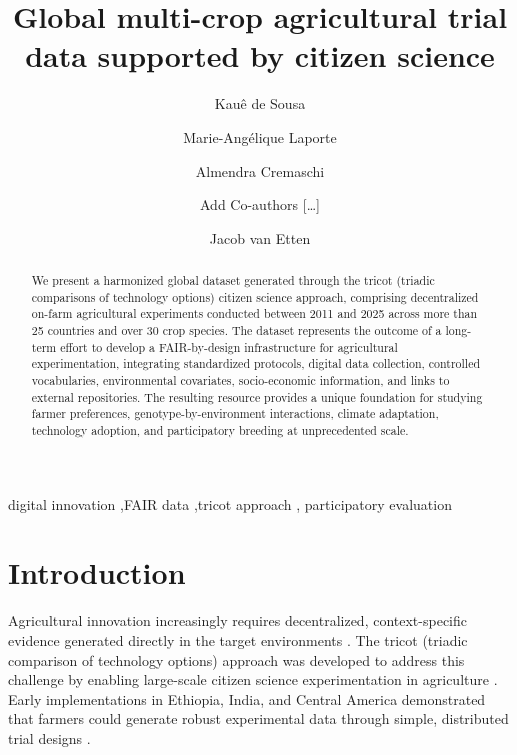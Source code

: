 \documentclass[3p]{elsarticle} %
\begin{document}
\begin{frontmatter}

  \title{Global multi-crop agricultural trial data supported by citizen
science}
    \author[a,b]{Kauê de Sousa%
  }
    \author[a]{Marie-Angélique Laporte%
  }
  
    \author[a]{Almendra Cremaschi%
  }
  
    \author[c]{Add Co-authors {[}\ldots{]}%
  }
  
    \author[a]{Jacob van Etten%
  }
  
  
  \begin{abstract}
  We present a harmonized global dataset generated through the tricot
  (triadic comparisons of technology options) citizen science approach,
  comprising decentralized on-farm agricultural experiments conducted
  between 2011 and 2025 across more than 25 countries and over 30 crop
  species. The dataset represents the outcome of a long-term effort to
  develop a FAIR-by-design infrastructure for agricultural
  experimentation, integrating standardized protocols, digital data
  collection, controlled vocabularies, environmental covariates,
  socio-economic information, and links to external repositories. The
  resulting resource provides a unique foundation for studying farmer
  preferences, genotype-by-environment interactions, climate adaptation,
  technology adoption, and participatory breeding at unprecedented
  scale.
  \end{abstract}
    \begin{keyword}
    digital innovation \sep FAIR data \sep tricot approach \sep 
    participatory evaluation
  \end{keyword}
  
 \end{frontmatter}

\section{Introduction}\label{introduction}

Agricultural innovation increasingly requires decentralized,
context-specific evidence generated directly in the target environments
\citep{deSousa2021, Atlin2001}. The tricot (triadic comparison of
technology options) approach was developed to address this challenge by
enabling large-scale citizen science experimentation in agriculture
\citep{vanEtten2016, vanEtten2011}. Early implementations in Ethiopia,
India, and Central America demonstrated that farmers could generate
robust experimental data through simple, distributed trial designs
\citep{vanEtten2016, vanEtten2019, deSousa2021, deSousa2024}.
\end{document}
